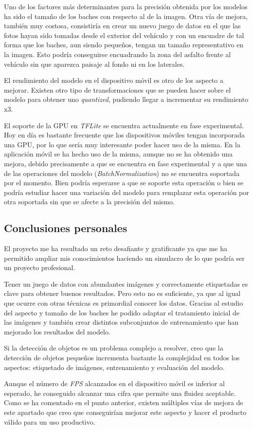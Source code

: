 Uno de los factores más determinantes para la precisión obtenida por los modelos ha sido el tamaño de los baches con respecto al de la imagen. Otra vía de mejora, también muy costosa, consistiría en crear un nuevo juego de datos en el que las fotos hayan sido tomadas desde el exterior del vehículo y con un encuadre de tal forma que los baches, aun siendo pequeños, tengan un tamaño representativo en la imagen. Esto podría conseguirse encuadrando la zona del asfalto frente al vehículo sin que aparezca paisaje al fondo ni en los laterales.

El rendimiento del modelo en el dispositivo móvil es otro de los aspecto a mejorar. Existen otro tipo de transformaciones que se pueden hacer sobre el modelo para obtener uno \textit{quantized}, pudiendo llegar a incrementar su rendimiento x3.

El soporte de la GPU en \textit{TFLite} se encuentra actualmente en fase experimental. Hoy en día es bastante frecuente que los dispositivos móviles tengan incorporada una GPU, por lo que sería muy interesante poder hacer uso de la misma. En la aplicación móvil se ha hecho uso de la misma, aunque no se ha obtenido una mejora, debido precisamente a que se encuentra en fase experimental y a que una de las operaciones del modelo (\textit{BatchNormalization}) no se encuentra soportada por el momento. Bien podría esperarse a que se soporte esta operación o bien se podría estudiar hacer una variación del modelo para remplazar esta operación por otra soportada sin que se afecte a la precisión del mismo.

\subsection{Conclusiones personales}

El proyecto me ha resultado un reto desafiante y gratificante ya que me ha permitido ampliar mis conocimientos haciendo un simulacro de lo que podría ser un proyecto profesional.

Tener un juego de datos con abundantes imágenes y correctamente etiquetadas es clave para obtener buenos resultados. Pero esto no es suficiente, ya que al igual que ocurre con otras técnicas es primordial conocer los datos. Gracias al estudio del aspecto y tamaño de los baches he podido adaptar el tratamiento inicial de las imágenes y también crear distintos subconjuntos de entrenamiento que han mejorado los resultados del modelo.

Si la detección de objetos es un problema complejo a resolver, creo que la detección de objetos pequeños incrementa bastante la complejidad en todos los aspectos: etiquetado de imágenes, entrenamiento y evaluación del modelo.

Aunque el número de \textit{FPS} alcanzados en el dispositivo móvil es inferior al esperado, he conseguido alcanzar una cifra que permite una fluidez aceptable. Como se ha comentado en el punto anterior, existen múltiples vías de mejora de este apartado que creo que conseguirían mejorar este aspecto y hacer el producto válido para un uso productivo.